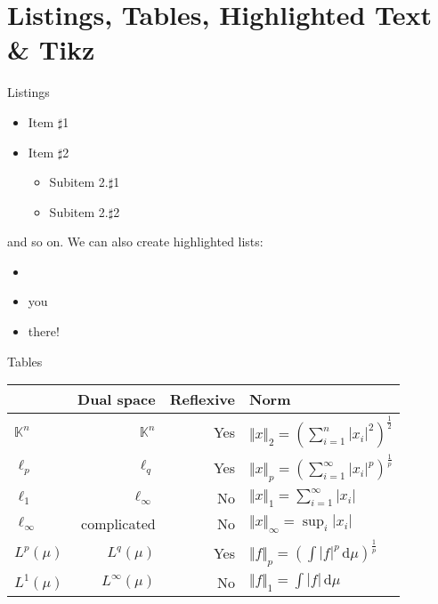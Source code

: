 \section{Listings, Tables, Highlighted Text \& Tikz}

\begin{frame}{Listings}
	\begin{itemize}
		\item Item $\sharp$1
		\item Item $\sharp$2
			\begin{itemize}
				\item Subitem 2.$\sharp$1
				\item Subitem 2.$\sharp$2
			\end{itemize} 
	\end{itemize}
	and so on. We can also create highlighted lists:
	\begin{itemize}[<+- | alert@+>]
		\item \alert<4>{\only<4>{or here?}}
		\item you
		\item there!
	\end{itemize}
\end{frame}

\begin{frame}{Tables}
	\begin{center}
		\begin{tabular}[]{lrrl}
			\toprule
								& \multicolumn{1}{c}{{\bfseries Dual space}}
			                    & \multicolumn{1}{c}{{\bfseries Reflexive}}
			                    & \multicolumn{1}{l}{{\bfseries Norm}} \\
			\midrule
			$\mathbb K^n$	& $\mathbb K^n$			& Yes			& $\Vert x\Vert_2 =\left(\sum_{i=1}^n |x_i|^2\right)^{\frac 12}$\\[0.5em]
			$\ell_p$			& $\ell_q$				& Yes			& $\Vert x\Vert_p = \left( \sum_{i=1}^\infty |x_i|^p \right)^{\frac 1p}$\\[0.5em]
			$\ell_1$			& $\ell_\infty$			& \alert{No}	& $\Vert x\Vert_1 = \sum_{i=1}^\infty |x_i|$\\[0.5em]
			$\ell_\infty$	& {\small complicated}	& \alert{No}	& $\Vert x\Vert_\infty = \sup_i |x_i|$\\[0.5em]
			$L^p(\mu)$		& $L^q(\mu)$			& Yes			& $\Vert f\Vert_p = \left( \int |f|^p \, \mathrm d\mu \right)^{\frac 1p}$\\[0.5em]
			$L^1(\mu)$		& $L^\infty(\mu)$ 		& \alert{No} 	& $\Vert f\Vert_1 = \int |f| \, \mathrm d\mu$\\
			\bottomrule
		\end{tabular}
	\end{center}
\end{frame}

